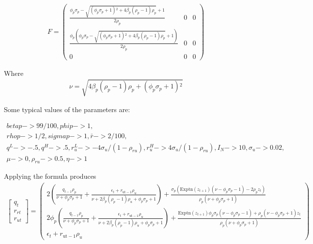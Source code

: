 \documentclass[12pt]{article}
\begin{document}
\begin{gather*}
  F=    \left(
   \begin{array}{ccc}
    \frac{\phi _p \sigma _p-\sqrt{\left(\phi _p \sigma _p+1\right){}^2+4 \beta
      _p \left(\rho _p-1\right) \rho _p}+1}{2 \rho _p} & 0 & 0 \\
    \frac{\phi _p \left(\phi _p \sigma _p-\sqrt{\left(\phi _p \sigma
      _p+1\right){}^2+4 \beta _p \left(\rho _p-1\right) \rho _p}+1\right)}{2
      \rho _p} & 0 & 0 \\
    0 & 0 & 0
   \end{array}
   \right)
\end{gather*}

Where
\begin{gather*}
  \nu=    \sqrt{4 \beta _p \left(\rho _p-1\right) \rho _p+\left(\phi _p \sigma
    _p+1\right){}^2}
\end{gather*}

\newcommand{\tVec}{
  \begin{bmatrix}
    q_t\\r_{rt}\\r_{ut}
  \end{bmatrix}}

Some typical values of the parameters are:

\begin{gather*}
  betap -> 99/100, phip -> 1, \\
rhop -> 1/2, sigmap -> 1, 
  \bar{r} -> 2/100, \\
q^L -> -.5, q^H -> .5, 
  r_u^L -> -4 \sigma_u/(1 - \rho_{ru}), r_u^H->  4\sigma_u/(1 - \rho_{ru}),
   I_N -> {10}, \sigma_u -> 0.02,\\
 \mu -> {0},\rho_{ru} -> 0.5,
   \eta -> 1
\end{gather*}


Applying the formula produces
\begin{gather*}
\tVec=      \left(
   \begin{array}{c}
    2 \left(\frac{q_{t-1} \rho _p}{\nu +\phi _p \sigma _p+1}+\frac{\epsilon
      _t+r_{\text{ut}-1} \rho _u}{\nu +2 \beta _p \left(\rho _p-1\right) \rho
      _u+\phi _p \sigma _p+1}\right)+\frac{\sigma _p
      \left(\text{Exptn}\left(z_{t+1}\right) \left(\nu -\phi _p \sigma
      _p-1\right)-2 \rho _p z_t\right)}{\rho _p \left(\nu +\phi _p \sigma
      _p+1\right)} \\
    2 \phi _p \left(\frac{q_{t-1} \rho _p}{\nu +\phi _p \sigma
      _p+1}+\frac{\epsilon _t+r_{\text{ut}-1} \rho _u}{\nu +2 \beta _p
      \left(\rho _p-1\right) \rho _u+\phi _p \sigma
      _p+1}\right)+\frac{\text{Exptn}\left(z_{t+1}\right) \phi _p \sigma _p
      \left(\nu -\phi _p \sigma _p-1\right)+\rho _p \left(\nu -\phi _p \sigma
      _p+1\right) z_t}{\rho _p \left(\nu +\phi _p \sigma _p+1\right)} \\
    \epsilon _t+r_{\text{ut}-1} \rho _u
   \end{array}
   \right)
\end{gather*}
\end{document}
